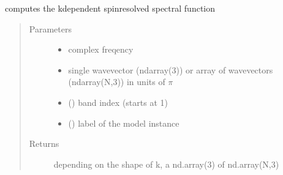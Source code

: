 \documentclass[letterpaper,10pt,english]{sphinxmanual}
\begin{document}
\begin{fulllineitems}
\label{\detokenize{functions:pyqcm.spin_spectral_function}}
\sphinxAtStartPar
computes the k\sphinxhyphen{}dependent spin\sphinxhyphen{}resolved spectral function
\begin{quote}\begin{description}
\item[{Parameters}] \leavevmode\begin{itemize}
\item {} 
\sphinxAtStartPar
{} \textendash{} complex freqency

\item {} 
\sphinxAtStartPar
{} \textendash{} single wavevector (ndarray(3)) or array of wavevectors (ndarray(N,3)) in units of \(\pi\)

\item {} 
\sphinxAtStartPar
{} () \textendash{} band index (starts at 1)

\item {} 
\sphinxAtStartPar
{} () \textendash{} label of the model instance

\end{itemize}

\item[{Returns}] \leavevmode
\sphinxAtStartPar
depending on the shape of k, a nd.array(3) of nd.array(N,3)

\end{description}\end{quote}

\end{fulllineitems}

\end{document}
